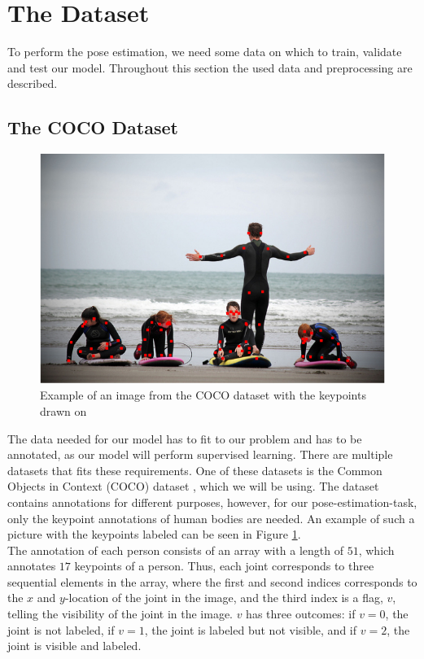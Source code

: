\documentclass[./main.tex]{subfiles}
\begin{document}
\section{The Dataset}
To perform the pose estimation, we need some data on which to train, validate and test our model. Throughout this section the used data and preprocessing are described.

\subsection{The COCO Dataset}
\begin{figure}[h]
    \centering
    \includegraphics[height = 4 cm]{./entities/coco_example.png}
    \caption{Example of an image from the COCO dataset with the keypoints drawn on \cite{COCO_article}}
    \label{fig:coco_example}
\end{figure}
The data needed for our model has to fit to our problem and has to be annotated, as our model will perform supervised learning. There are multiple datasets that fits these requirements. One of these datasets is the Common Objects in Context (COCO) dataset \cite{COCO_article}, which we will be using. The dataset contains annotations for different purposes, however, for our pose-estimation-task, only the keypoint annotations of human bodies are needed. An example of such a picture with the keypoints labeled can be seen in Figure \ref{fig:coco_example}. \\
The annotation of each person consists of an array with a length of $51$, which annotates $17$ keypoints of a person. Thus, each joint corresponds to three sequential elements in the array, where the first and second indices corresponds to the $x$ and $y$-location of the joint in the image, and the third index is a flag, $v$, telling the visibility of the joint in the image. $v$ has three outcomes: if $v = 0$, the joint is not labeled, if $v = 1$, the joint is labeled but not visible, and if $v = 2$, the joint is visible and labeled. \\
\end{document}
